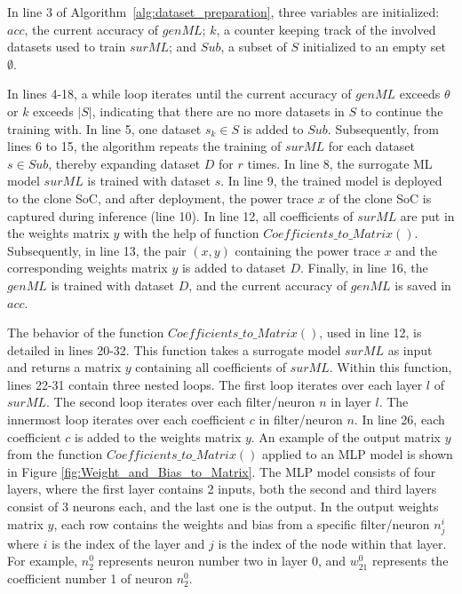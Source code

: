 \documentclass[letterpaper]{article}
\begin{document}
In line 3 of Algorithm~\ref{alg:dataset_preparation}, three variables are initialized: $acc$, the current accuracy of $genML$; $k$, a counter keeping track of the involved datasets used to train $surML$; and $Sub$, a subset of $S$ initialized to an empty set $\emptyset$.

In lines 4-18, a while loop iterates until the current accuracy of $genML$ exceeds $\theta$ or $k$ exceeds $|S|$, indicating that there are no more datasets in $S$ to continue the training with. In line 5, one dataset $s_k \in S$ is added to $Sub$. Subsequently, from lines 6 to 15, the algorithm repeats the training of $surML$ for each dataset $s \in Sub$, thereby expanding dataset $D$ for $r$ times. In line 8, the surrogate ML model $surML$ is trained with dataset $s$. In line 9, the trained model is deployed to the clone SoC, and after deployment, the power trace $x$ of the clone SoC is captured during inference (line 10). In line 12, all coefficients of $surML$ are put in the weights matrix $y$ with the help of function $Coefficients\_to\_Matrix()$. Subsequently, in line 13, the pair $(x, y)$ containing the power trace $x$ and the corresponding weights matrix $y$ is added to dataset $D$. Finally, in line 16, the $genML$ is trained with dataset $D$, and the current accuracy of $genML$ is saved in $acc$.

The behavior of the function $Coefficients\_to\_Matrix()$, used in line 12, is detailed in lines 20-32. This function takes a surrogate model $surML$ as input and returns a matrix $y$ containing all coefficients of $surML$. Within this function, lines 22-31 contain three nested loops. The first loop iterates over each layer $l$ of $surML$. The second loop iterates over each filter/neuron $n$ in layer $l$. The innermost loop iterates over each coefficient $c$ in filter/neuron $n$. In line 26, each coefficient $c$ is added to the weights matrix $y$. An example of the output matrix $y$ from the function $Coefficients\_to\_Matrix()$ applied to an MLP model is shown in Figure \ref{fig:Weight_and_Bias_to_Matrix}. The MLP model consists of four layers, where the first layer contains 2 inputs, both the second and third layers consist of 3 neurons each, and the last one is the output. In the output weights matrix $y$, each row contains the weights and bias from a specific filter/neuron $n^i_j$  where $i$ is the index of the layer and $j$ is the index of the node within that layer. For example, $n^0_2$ represents neuron number two in layer 0, and $w^0_{21}$ represents the coefficient number 1 of neuron $n^0_2$.
\end{document}

